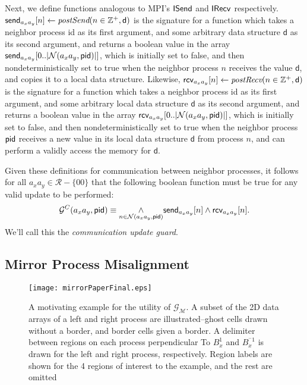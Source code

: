 Next, we define functions analogous to MPI's
$\textsf{\textup{ISend}}$ and $\textsf{\textup{IRecv}}$ respectively.
$\textsf{send}_{a_xa_y}[n] \leftarrow \textit{postSend}(n\in\mathbb{Z}^+,\textsf{d})$ is the signature for
a function which takes a neighbor process id as its first argument, and some
arbitrary data structure $\textsf{d}$ as its second argument, and returns a boolean value
in the array $\textsf{send}_{a_xa_y}[0..|\mathcal{N}(a_xa_y,\textup{\textsf{pid}})|]$,
 which is initially set to false, and then
nondeterministically set to true when the neighbor process $n$ receives
the value $\textsf{d}$, and copies it to a local data structure.  Likewise,
$\textsf{rcv}_{a_xa_y}[n] \leftarrow \textit{postRecv}(n\in\mathbb{Z}^+,\textsf{d})$ is the signature for
a function which takes a neighbor process id as its first argument, and some
arbitrary local data structure $\textsf{d}$ as its second argument,
and returns a boolean value
in the array $\textsf{rcv}_{a_xa_y}[0..|\mathcal{N}(a_xa_y,\textup{\textsf{pid}})|]$,
 which is initially set to false, and then
nondeterministically set to true when the neighbor process
$\textup{\textsf{pid}}$ receives a new value in its local data structure $\textsf{d}$
from process $n$, and can perform a validly access the memory for $\textsf{d}$.

Given these definitions for communication between neighbor processes, it follows
for all $a_xa_y\in\mathcal{R} - \{00\}$ that the following boolean function
must be true for any valid update to be performed:
\begin{equation}
    \mathcal{G}^C(a_xa_y,\textup{\textsf{pid}}) \equiv \underset{n \in \mathcal{N}(a_xa_y,\textup{\textsf{pid}})}{\wedge}
    \textsf{send}_{a_xa_y}[n] \wedge \textsf{rcv}_{a_xa_y}[n].
    \label{eq:comm_guard}
\end{equation}
We'll call this the {\it communication update guard}.

\subsection{Mirror Process Misalignment}

\begin{figure}[h]
    \centering
    \texttt{[image: mirrorPaperFinal.eps]}
    \caption{A motivating example for the utility of $\mathcal{G_M}$.  A subset of the
    2D data arrays of a left and right process are illustrated--ghost cells drawn without a border, and
    border cells given a border.  A delimiter between regions on each process perpendicular To
     $B_x^{1}$ and $B_x^{^-1}$ is drawn for the left and right process, respectively.  Region labels
     are shown for the 4 regions of interest to the example, and the rest are omitted}
    \label{fig:mirror_motivation}
\end{figure}


